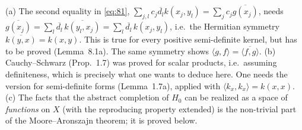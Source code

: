 \documentclass[11pt,a4paper]{article}
\numberwithin{equation}{section}
\newcommand{\ip}[2]{\langle #1, #2\rangle}
\newcommand{\conj}[1]{\overline{#1}}
\theoremstyle{plain}
\theoremstyle{definition}
\theoremstyle{plain}
\theoremstyle{definition}
\begin{document}
\begin{correction}
(a) The second equality in \eqref{eq:81},
$\sum_{j,l}c_j\conj{d_l}k(x_j,y_l)=\sum_jc_j\conj{g(x_j)}$, needs
$\conj{g(x_j)}=\sum_l\conj{d_l}\,\conj{k(y_l,x_j)}=\sum_l\conj{d_l}\,k(x_j,y_l)$, i.e.\ the
Hermitian symmetry $\conj{k(y,x)}=k(x,y)$. This is true for every positive semi-definite
kernel, but has to be proved (Lemma~8.1a). The same symmetry shows
$\ip gf=\conj{\ip fg}$.
(b) Cauchy--Schwarz (Prop.~1.7) was proved for scalar products, i.e.\ assuming
definiteness, which is precisely what one wants to deduce here. One needs the version for
semi-definite forms (Lemma~1.7a), applied with $\ip{k_x}{k_x}=k(x,x)$.
(c) The facts that the abstract completion of $H_0$ can be realized as a space of
\emph{functions} on $X$ (with the reproducing property extended) is the non-trivial part
of the Moore--Aronszajn theorem; it is proved below.
\end{correction}
\end{document}
